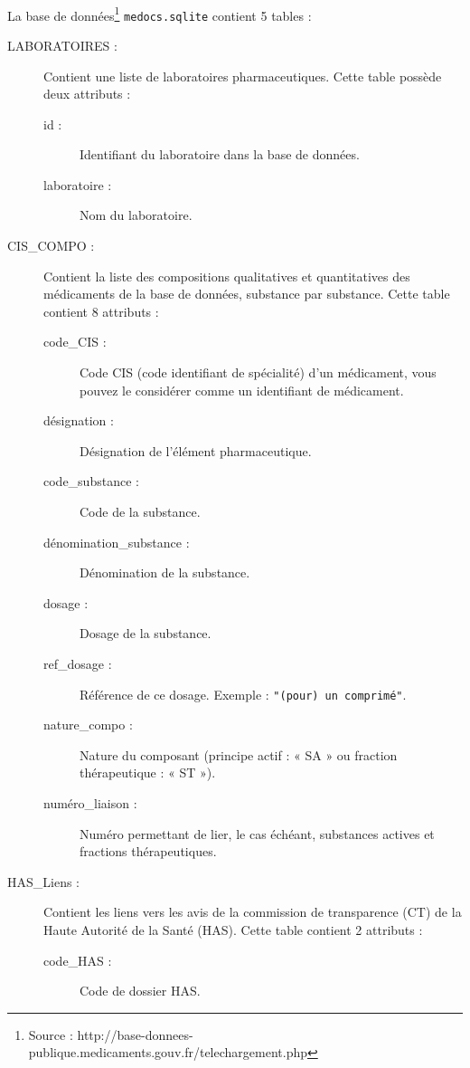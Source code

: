 \exer{[SQL-001]}
\setcounter{numques}{0}~\\


La base de données\footnote{Source : http://base-donnees-publique.medicaments.gouv.fr/telechargement.php} \texttt{medocs.sqlite} contient 5 tables : 

\begin{description}
  \item[LABORATOIRES :] Contient une liste de laboratoires pharmaceutiques. Cette table possède deux attributs : 
    \begin{description}
      \item[id :] Identifiant du laboratoire dans la base de données.
      \item[laboratoire :] Nom du laboratoire.
    \end{description}
  \item[CIS\_COMPO :] Contient la liste des compositions qualitatives et quantitatives des médicaments de la base de données, substance par substance. Cette table contient 8 attributs :
    \begin{description}
      \item[code\_CIS :] Code CIS (code identifiant de spécialité) d'un médicament, vous pouvez le considérer comme un identifiant de médicament. 
      \item[désignation :] Désignation de l'élément pharmaceutique. 
      \item[code\_substance :] Code de la substance.
      \item[dénomination\_substance :] Dénomination de la substance. 
      \item[dosage :] Dosage de la substance. 
      \item[ref\_dosage :] Référence de ce dosage. Exemple : \texttt{"(pour) un comprimé"}.
      \item[nature\_compo :]   Nature du composant (principe actif : « SA » ou fraction thérapeutique : « ST »).
      \item[numéro\_liaison :]  Numéro permettant de lier, le cas échéant, substances actives et fractions thérapeutiques.
    \end{description}
  \item[HAS\_Liens :] Contient les liens vers les avis de la commission de transparence (CT) de la Haute Autorité de la Santé (HAS). Cette table contient 2 attributs : 
    \begin{description}
      \item[code\_HAS :] Code de dossier HAS. 

\end{description}
\end{description}
